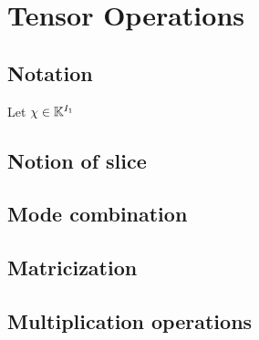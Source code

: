 \chapter{Tensor Operations}

\section{Notation}
Let $\chi\in \mathbb{K}^{I_1}$


\section{Notion of slice}

\section{Mode combination}

\section{Matricization}

\section{Multiplication operations}